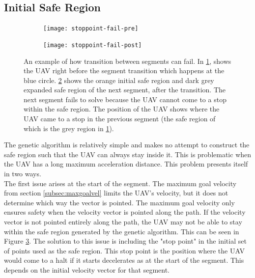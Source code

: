 \subsection{Initial Safe Region}
\label{subsec:safe-ext}
\begin{figure}
	\centering
	\begin{subfigure}[t]{0.35\columnwidth}
        		\texttt{[image: stoppoint-fail-pre]}
        		\caption{}
        		\label{fig:stoppoint-fail-pre}
	\end{subfigure}
	\hfill
	\begin{subfigure}[t]{0.35\columnwidth}
        		\texttt{[image: stoppoint-fail-post]}
        		\caption{}
        		 \label{fig:stoppoint-fail-post}
	\end{subfigure}		
	\caption[A case in which a lack of stop point makes a segment transition fail]{An example of how transition between segments can fail. In \ref{fig:stoppoint-fail-pre}, shows the UAV right before the segment transition which happens at the blue circle. \ref{fig:stoppoint-fail-post} shows the orange initial safe region and dark grey expanded safe region of the next segment, after the transition. The next segment fails to solve because the UAV cannot come to a stop within the safe region. The position of the UAV shows where the UAV came to a stop in the previous segment (the safe region of which is the grey region in \ref{fig:stoppoint-fail-pre}).}
    \label{fig:stoppoint-fail}     
\end{figure}

The genetic algorithm is relatively simple and makes no attempt to construct the safe region such that the UAV can always stay inside it. This is problematic when the UAV has a long maximum acceleration distance. This problem presents itself in two ways.\\
The first issue arises at the start of the segment. The maximum goal velocity from section \ref{subsec:maxgoalvel} limits the UAV's velocity, but it does not determine which way the vector is pointed. The maximum goal velocity only ensures safety when the velocity vector is pointed along the path. If the velocity vector is not pointed entirely along the path, the UAV may not be able to stay within the safe region generated by the genetic algorithm. This can be seen in Figure \ref{fig:stoppoint-fail}. The solution to this issue is including the "stop point" in the initial set of points used as the safe region. This stop point is the position where the UAV would come to a halt if it starts decelerates as at the start of the segment. This depends on the initial velocity vector for that segment.\\


